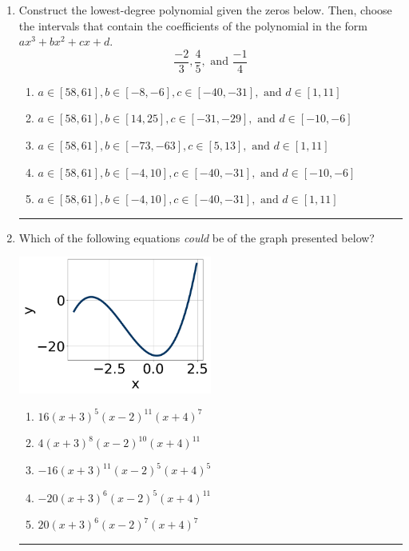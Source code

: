 \documentclass[14pt]{extbook}
\newcommand{\litem}[1]{\item#1\hspace*{-1cm}\rule{\textwidth}{0.4pt}}
\begin{document}
\begin{enumerate}
{\begin{enumerate}[label=\Alph*.]
\end{enumerate} }
\litem{
Construct the lowest-degree polynomial given the zeros below. Then, choose the intervals that contain the coefficients of the polynomial in the form $ax^3+bx^2+cx+d$.\[ \frac{-2}{3}, \frac{4}{5}, \text{ and } \frac{-1}{4} \]\begin{enumerate}[label=\Alph*.]
\item \( a \in [58, 61], b \in [-8, -6], c \in [-40, -31], \text{ and } d \in [1, 11] \)
\item \( a \in [58, 61], b \in [14, 25], c \in [-31, -29], \text{ and } d \in [-10, -6] \)
\item \( a \in [58, 61], b \in [-73, -63], c \in [5, 13], \text{ and } d \in [1, 11] \)
\item \( a \in [58, 61], b \in [-4, 10], c \in [-40, -31], \text{ and } d \in [-10, -6] \)
\item \( a \in [58, 61], b \in [-4, 10], c \in [-40, -31], \text{ and } d \in [1, 11] \)

\end{enumerate} }
\litem{
Which of the following equations \textit{could} be of the graph presented below?
\begin{center}
    \includegraphics[width=0.5\textwidth]{../Figures/polyGraphToFunctionCopyA.png}
\end{center}
\begin{enumerate}[label=\Alph*.]
\item \( 16(x + 3)^{5} (x - 2)^{11} (x + 4)^{7} \)
\item \( 4(x + 3)^{8} (x - 2)^{10} (x + 4)^{11} \)
\item \( -16(x + 3)^{11} (x - 2)^{5} (x + 4)^{5} \)
\item \( -20(x + 3)^{6} (x - 2)^{5} (x + 4)^{11} \)
\item \( 20(x + 3)^{6} (x - 2)^{7} (x + 4)^{7} \)


\end{enumerate}}
\end{enumerate}
\end{document}
